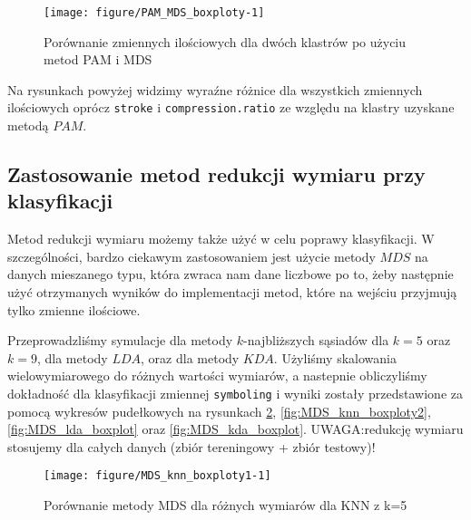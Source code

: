 \documentclass[12pt, a4paper]{article}\usepackage[]{graphicx}\usepackage[]{xcolor}
\makeatletter
\def\maxwidth{ %
  \ifdim\Gin@nat@width>\linewidth
    \linewidth
  \else
    \Gin@nat@width
  \fi
}
\newenvironment{knitrout}{}{} %
\makeatother
\begin{document}
\begin{knitrout}
\color{fgcolor}\begin{figure}[H]

{\centering \texttt{[image: figure/PAM\_MDS\_boxploty-1]} 

}

\caption[Porównanie zmiennych ilościowych dla dwóch klastrów po użyciu metod PAM i MDS]{Porównanie zmiennych ilościowych dla dwóch klastrów po użyciu metod PAM i MDS}\label{fig:PAM_MDS_boxploty}
\end{figure}

\end{knitrout}
Na rysunkach powyżej widzimy wyraźne różnice dla wszystkich zmiennych ilościowych oprócz \texttt{stroke} i \texttt{compression.ratio} ze względu na klastry uzyskane metodą $PAM$.

\subsection{Zastosowanie metod redukcji wymiaru przy klasyfikacji}

Metod redukcji wymiaru możemy także użyć w celu poprawy klasyfikacji. W szczególności, bardzo ciekawym zastosowaniem jest użycie metody $MDS$ na danych mieszanego typu, która zwraca nam dane liczbowe po to, żeby następnie użyć otrzymanych wyników do implementacji metod, które na wejściu przyjmują tylko zmienne ilościowe.
\par Przeprowadzliśmy symulacje dla metody $k$-najbliższych sąsiadów dla $k=5$ oraz $k=9$, dla metody $LDA$, oraz dla metody $KDA$. Użyliśmy skalowania wielowymiarowego do różnych wartości wymiarów, a nastepnie obliczyliśmy dokładność dla klasyfikacji zmiennej \texttt{symboling} i wyniki zostały przedstawione za pomocą wykresów pudełkowych na rysunkach \ref{fig:MDS_knn_boxploty1}, \ref{fig:MDS_knn_boxploty2}, \ref{fig:MDS_lda_boxplot} oraz \ref{fig:MDS_kda_boxplot}. UWAGA:redukcję wymiaru stosujemy dla całych danych (zbiór tereningowy + zbiór testowy)!




\begin{knitrout}
\color{fgcolor}\begin{figure}[H]

{\centering \texttt{[image: figure/MDS\_knn\_boxploty1-1]} 

}

\caption[Porównanie metody MDS dla różnych wymiarów dla KNN z k=5]{Porównanie metody MDS dla różnych wymiarów dla KNN z k=5}\label{fig:MDS_knn_boxploty1}
\end{figure}

\end{knitrout}
\end{document}
